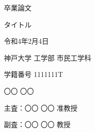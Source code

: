 \documentclass[12pt]{jsarticle}
\begin{document}
\begin{titlepage}
  \begin{center}
  \vspace*{70truept}

  {\huge 卒業論文}
  
  \vspace{30truept}
  
  \begin{spacing}{1.2}
    \huge タイトル
  \end{spacing}
  
  \vspace{150truept}

  {\LARGE 令和4年2月4日}

  \vspace{20truept}

  {\huge 神戸大学 工学部 市民工学科}

  \vspace{20truept}
  
  {\LARGE 学籍番号 1111111T}

  \vspace{20truept}

  {\huge 〇〇 〇〇}

  \vspace{50truept}

  {\LARGE 主査：〇〇 〇〇 准教授}

  \vspace{20truept}

  {\LARGE 副査：〇〇 〇〇 教授}
  
  \end{center}
  \end{titlepage}

  \clearpage
\end{document}
